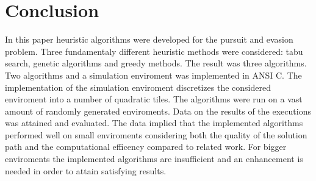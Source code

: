 \chapter{Conclusion}
In this paper heuristic algorithms were developed for the pursuit and evasion problem. Three fundamentaly different heuristic methods were considered: tabu search, genetic algorithms and greedy methods. The result was three algorithms. Two algorithms and a simulation enviroment was implemented in ANSI C. The implementation of the simulation enviroment discretizes the considered enviroment into a number of quadratic tiles. The algorithms were run on a vast amount of randomly generated enviroments. Data on the results of the executions was attained and evaluated. The data implied that the implemented algorithms performed well on small enviroments considering both the quality of the solution path and the computational efficency compared to related work. For bigger enviroments the implemented algorithms are insufficient and an enhancement is needed in order to attain satisfying results.
